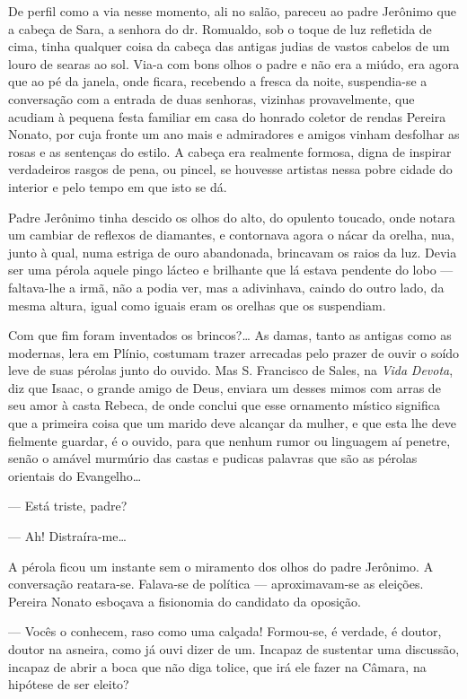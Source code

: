 \noindent{}De perfil como a via nesse momento, ali no salão, pareceu ao padre
Jerônimo que a cabeça de Sara, a senhora do dr. Romualdo, sob o toque de
luz refletida de cima, tinha qualquer coisa da cabeça das antigas judias
de vastos cabelos de um louro de searas ao sol. Via-a com bons olhos o
padre e não era a miúdo, era agora que ao pé da janela, onde ficara,
recebendo a fresca da noite, suspendia-se a conversação com a entrada de
duas senhoras, vizinhas provavelmente, que acudiam à pequena festa
familiar em casa do honrado coletor de rendas Pereira Nonato, por cuja
fronte um ano mais e admiradores e amigos vinham desfolhar as rosas e as
sentenças do estilo. A cabeça era realmente formosa, digna de inspirar
verdadeiros rasgos de pena, ou pincel, se houvesse artistas nessa pobre
cidade do interior e pelo tempo em que isto se dá.

Padre Jerônimo tinha descido os olhos do alto, do opulento toucado, onde
notara um cambiar de reflexos de diamantes, e contornava agora o nácar
da orelha, nua, junto à qual, numa estriga de ouro abandonada, brincavam
os raios da luz. Devia ser uma pérola aquele pingo lácteo e brilhante
que lá estava pendente do lobo --- faltava-lhe a irmã, não a podia ver,
mas a adivinhava, caindo do outro lado, da mesma altura, igual como
iguais eram os orelhas que os suspendiam.

Com que fim foram inventados os brincos?\ldots{} As damas, tanto as antigas
como as modernas, lera em Plínio, costumam trazer arrecadas pelo prazer
de ouvir o soído leve de suas pérolas junto do ouvido. Mas S. Francisco
de Sales, na \emph{Vida} \emph{Devota}, diz que Isaac, o grande amigo de
Deus, enviara um desses mimos com arras de seu amor à casta Rebeca, de
onde conclui que esse ornamento místico significa que a primeira coisa
que um marido deve alcançar da mulher, e que esta lhe deve fielmente
guardar, é o ouvido, para que nenhum rumor ou linguagem aí penetre,
senão o amável murmúrio das castas e pudicas palavras que são as pérolas
orientais do Evangelho\ldots{}

--- Está triste, padre?

--- Ah! Distraíra-me\ldots{}

A pérola ficou um instante sem o miramento dos olhos do padre Jerônimo.
A conversação reatara-se. Falava-se de política --- aproximavam-se as
eleições. Pereira Nonato esboçava a fisionomia do candidato da oposição.

--- Vocês o conhecem, raso como uma calçada! Formou-se, é verdade, é
doutor, doutor na asneira, como já ouvi dizer de um. Incapaz de
sustentar uma discussão, incapaz de abrir a boca que não diga tolice,
que irá ele fazer na Câmara, na hipótese de ser eleito?

